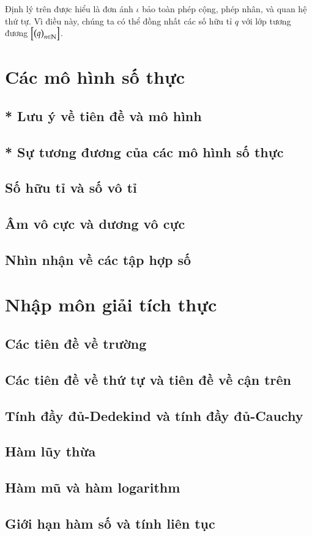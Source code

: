 Định lý trên được hiểu là đơn ánh $\iota$ bảo toàn phép cộng, phép nhân, và quan hệ thứ tự. Vì điều này, chúng ta có thể đồng nhất các số hữu tỉ $q$ với lớp tương đương $\left[{\left({q}\right)}_{{n}\in\mathbb{N}}\right]$.

\section{Các mô hình số thực}

\subsection{* Lưu ý về tiên đề và mô hình}

\subsection{* Sự tương đương của các mô hình số thực}

\subsection{Số hữu tỉ và số vô tỉ}

\subsection{Âm vô cực và dương vô cực}

\subsection{Nhìn nhận về các tập hợp số}

\section{Nhập môn giải tích thực}

\subsection{Các tiên đề về trường}

\subsection{Các tiên đề về thứ tự và tiên đề về cận trên}

\subsection{Tính đầy đủ-Dedekind và tính đầy đủ-Cauchy}

\subsection{Hàm lũy thừa}

\subsection{Hàm mũ và hàm logarithm}

\subsection{Giới hạn hàm số và tính liên tục}


